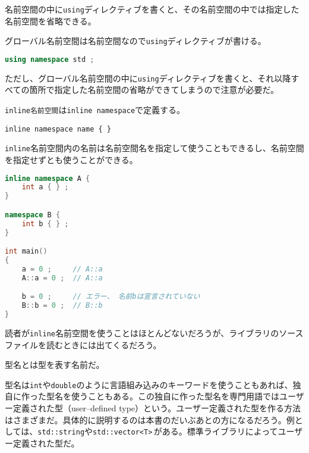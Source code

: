 名前空間の中に\texttt{using}ディレクティブを書くと、その名前空間の中では指定した名前空間を省略できる。

グローバル名前空間は名前空間なので\texttt{using}ディレクティブが書ける。

\begin{lstlisting}[language={C++}]
using namespace std ;
\end{lstlisting}

ただし、グローバル名前空間の中に\texttt{using}ディレクティブを書くと、それ以降すべての箇所で指定した名前空間の省略ができてしまうので注意が必要だ。


\texttt{inline名前空間}は\texttt{inline namespace}で定義する。

\begin{lstlisting}[style=grammar]
inline namespace name { }
\end{lstlisting}

\texttt{inline}名前空間内の名前は名前空間名を指定して使うこともできるし、名前空間を指定せずとも使うことができる。

\begin{lstlisting}[language={C++}]
inline namespace A {
    int a { } ;
}

namespace B {
    int b { } ;
}

int main()
{
    a = 0 ;     // A::a
    A::a = 0 ;  // A::a

    b = 0 ;     // エラー、 名前bは宣言されていない
    B::b = 0 ;  // B::b
}
\end{lstlisting}

読者が\texttt{inline}名前空間を使うことはほとんどないだろうが、ライブラリのソースファイルを読むときには出てくるだろう。


型名とは型を表す名前だ。

型名は\texttt{int}や\texttt{double}のように言語組み込みのキーワードを使うこともあれば、独自に作った型名を使うこともある。この独自に作った型名を専門用語ではユーザー定義された型（user--defined type）という。ユーザー定義された型を作る方法はさまざまだ。具体的に説明するのは本書のだいぶあとの方になるだろう。例としては、\texttt{std::string}や\texttt{std::vector<T>}\,がある。標準ライブラリによってユーザー定義された型だ。


